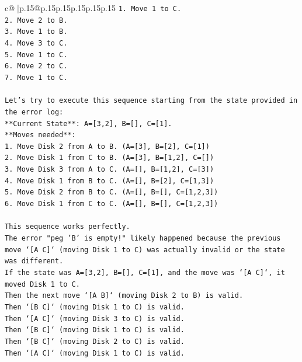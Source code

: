 \documentclass{article}
\begin{document}
{\begin{supertabular}{c@{$\;$}|p{.15\linewidth}@{}p{.15\linewidth}p{.15\linewidth}p{.15\linewidth}p{.15\linewidth}p{.15\linewidth}}
{{{\texttt{1. Move 1 to C.} \\
\texttt{2. Move 2 to B.} \\
\texttt{3. Move 1 to B.} \\
\texttt{4. Move 3 to C.} \\
\texttt{5. Move 1 to C.} \\
\texttt{6. Move 2 to C.} \\
\texttt{7. Move 1 to C.} \\
\\ 
\texttt{Let's try to execute this sequence starting from the state provided in the error log:} \\
\texttt{**Current State**: A={[}3,2{]}, B={[}{]}, C={[}1{]}.} \\
\texttt{**Moves needed**:} \\
\texttt{1. Move Disk 2 from A to B. (A={[}3{]}, B={[}2{]}, C={[}1{]})} \\
\texttt{2. Move Disk 1 from C to B. (A={[}3{]}, B={[}1,2{]}, C={[}{]})} \\
\texttt{3. Move Disk 3 from A to C. (A={[}{]}, B={[}1,2{]}, C={[}3{]})} \\
\texttt{4. Move Disk 1 from B to C. (A={[}{]}, B={[}2{]}, C={[}1,3{]})} \\
\texttt{5. Move Disk 2 from B to C. (A={[}{]}, B={[}{]}, C={[}1,2,3{]})} \\
\texttt{6. Move Disk 1 from C to C. (A={[}{]}, B={[}{]}, C={[}1,2,3{]})} \\
\\ 
\texttt{This sequence works perfectly.} \\
\texttt{The error "peg 'B' is empty!" likely happened because the previous move `{[}A C{]}` (moving Disk 1 to C) was actually invalid or the state was different.} \\
\texttt{If the state was A={[}3,2{]}, B={[}{]}, C={[}1{]}, and the move was `{[}A C{]}`, it moved Disk 1 to C.} \\
\texttt{Then the next move `{[}A B{]}` (moving Disk 2 to B) is valid.} \\
\texttt{Then `{[}B C{]}` (moving Disk 1 to C) is valid.} \\
\texttt{Then `{[}A C{]}` (moving Disk 3 to C) is valid.} \\
\texttt{Then `{[}B C{]}` (moving Disk 1 to C) is valid.} \\
\texttt{Then `{[}B C{]}` (moving Disk 2 to C) is valid.} \\
\texttt{Then `{[}A C{]}` (moving Disk 1 to C) is valid.} \\
}}}
\end{supertabular}}
\end{document}
